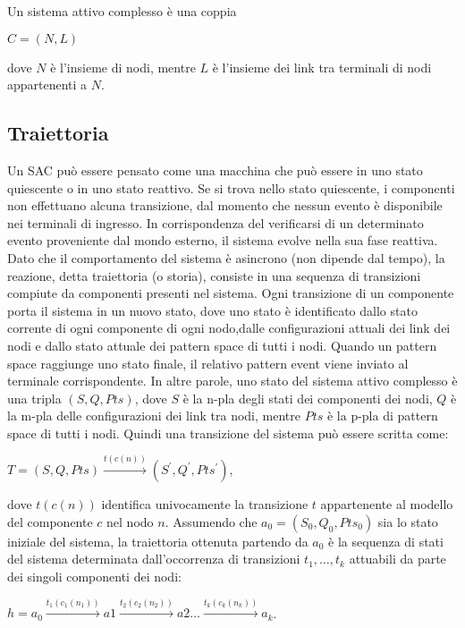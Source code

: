\begin{defn}
Un sistema attivo complesso è una coppia
\begin{center}
	$ C = (N,L)$
\end{center}
dove $N$ è l'insieme di nodi, mentre $L$ è l'insieme dei link tra terminali di nodi appartenenti a $N$.
\end{defn}


\subsection{Traiettoria}
Un SAC può essere pensato come una macchina che può essere in uno stato quiescente o in uno stato reattivo. Se si trova nello stato quiescente, i componenti non effettuano alcuna transizione, dal momento che nessun evento è disponibile nei terminali di ingresso. In corrispondenza del verificarsi di un determinato evento proveniente dal mondo esterno, il sistema evolve nella sua fase reattiva. Dato che il comportamento del sistema è asincrono (non dipende dal tempo), la reazione, detta traiettoria (o storia), consiste in una sequenza di transizioni compiute da componenti presenti nel sistema.
Ogni transizione di un componente porta il sistema in un nuovo stato, dove uno stato è identificato dallo stato corrente di ogni componente di ogni nodo,dalle configurazioni attuali dei link dei nodi e dallo stato attuale dei pattern space di tutti i nodi. Quando un pattern space raggiunge uno stato finale, il relativo pattern event viene inviato al terminale corrispondente.
In altre parole, uno stato del sistema attivo complesso è una tripla $(S,Q,Pts)$, dove $S$ è la n-pla degli stati dei componenti dei nodi, $Q$ è la m-pla delle configurazioni dei link tra nodi, mentre $Pts$ è la p-pla di pattern space di tutti i nodi.
Quindi una transizione del sistema può essere scritta come:
\begin{center}
	$T = (S,Q,Pts) \xrightarrow {t(c(n))} (S^\prime,Q^\prime,Pts^\prime)$,
\end{center}
dove $t(c(n))$ identifica univocamente la transizione $t$ appartenente al modello del componente $c$ nel nodo $n$.
Assumendo che $a_0 = (S_0,Q_0,Pts_0)$ sia lo stato iniziale del sistema, la traiettoria ottenuta partendo da $a_0$ è la sequenza di stati del sistema determinata dall'occorrenza di transizioni $t_1, \ldots , t_k$ attuabili da parte dei singoli componenti dei nodi:
\begin{center}
$h = a_0 \xrightarrow{t_1(c_1(n_1))} a1 \xrightarrow{t_2(c_2(n_2))} a2 \ldots \xrightarrow{t_k(c_k(n_k))} a_k$.
\end{center}

